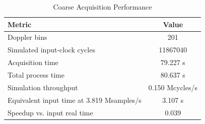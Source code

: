 \begin{table}[htbp]
\caption{Coarse Acquisition Performance}
\begin{center}
\begin{tabular}{|l|c|}
\hline
\textbf{Metric} & \textbf{Value} \\
\hline
Doppler bins & 201 \\
\hline
Simulated input-clock cycles & 11867040 \\
\hline
Acquisition time & 79.227 s \\
\hline
Total process time & 80.637 s \\
\hline
Simulation throughput & 0.150 Mcycles/s \\
\hline
Equivalent input time at 3.819 Msamples/s & 3.107 s \\
\hline
Speedup vs. input real time & 0.039 \\
\hline
\end{tabular}
\label{tab:perf}
\end{center}
\end{table}

